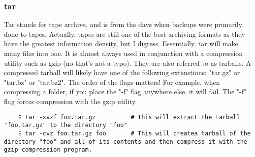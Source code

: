 \subsubsection{tar} \mdseries
Tar stands for tape archive, and is from the days when backups were primarily done to tapes.  Actually, tapes are still one of the best archiving formats as they have the greatest information density, but I digress.  Essentially, tar will make many files into one.  It is almost always used in conjunction with a compression utility such as gzip (no that's not a typo).  They are also referred to as tarballs.  A compressed tarball will likely have one of the following extenstions: "tar.gz" or "tar.bz" or "tar.bz2".  The order of the flags matters!  For example, when compressing a folder, if you place the "-f" flag anywhere else, it will fail.  The "-f" flag forces compression with the gzip utility.

	\begin{verbatim}
	$ tar -xvzf foo.tar.gz			# This will extract the tarball "foo.tar.gz" to the directory "foo"
	$ tar -cvz foo.tar.gz foo		# This will createa tarball of the directory "foo" and all of its contents and then compress it with the gzip compression program.
	\end{verbatim}



